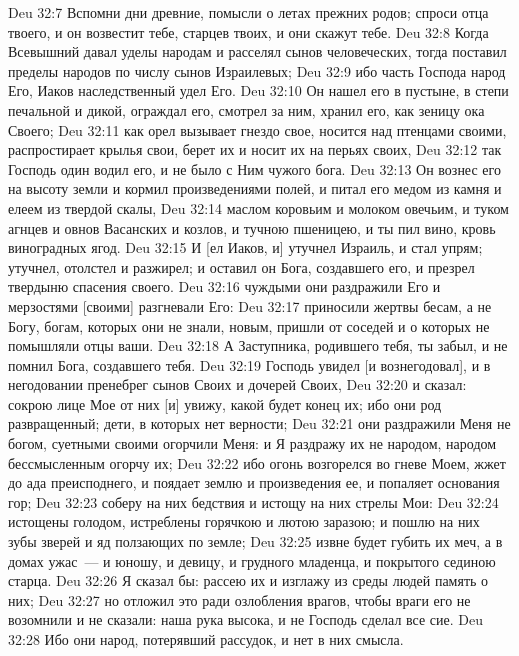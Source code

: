 \vs Deu 32:7 Вспомни дни древние, помысли о летах прежних родов; спроси отца твоего, и он возвестит тебе, старцев твоих, и они скажут тебе.
\vs Deu 32:8 Когда Всевышний давал уделы народам и расселял сынов человеческих, тогда поставил пределы народов по числу сынов Израилевых;
\vs Deu 32:9 ибо часть Господа народ Его, Иаков наследственный удел Его.
\vs Deu 32:10 Он нашел его в пустыне, в степи печальной и дикой, ограждал его, смотрел за ним, хранил его, как зеницу ока Своего;
\vs Deu 32:11 как орел вызывает гнездо свое, носится над птенцами своими, распростирает крылья свои, берет их и носит их на перьях своих,
\vs Deu 32:12 так Господь один водил его, и не было с Ним чужого бога.
\vs Deu 32:13 Он вознес его на высоту земли и кормил произведениями полей, и питал его медом из камня и елеем из твердой скалы,
\vs Deu 32:14 маслом коровьим и молоком овечьим, и туком агнцев и овнов Васанских и козлов, и тучною пшеницею, и ты пил вино, кровь виноградных ягод.
\vs Deu 32:15 И [ел Иаков, и] утучнел Израиль, и стал упрям; утучнел, отолстел и разжирел; и оставил он Бога, создавшего его, и презрел твердыню спасения своего.
\vs Deu 32:16  чуждыми они раздражили Его и мерзостями [своими] разгневали Его:
\vs Deu 32:17 приносили жертвы бесам, а не Богу, богам, которых они не знали, новым,  пришли от соседей и о которых не помышляли отцы ваши.
\vs Deu 32:18 А Заступника, родившего тебя, ты забыл, и не помнил Бога, создавшего тебя.
\vs Deu 32:19 Господь увидел [и вознегодовал], и в негодовании пренебрег сынов Своих и дочерей Своих,
\vs Deu 32:20 и сказал: сокрою лице Мое от них [и] увижу, какой будет конец их; ибо они род развращенный; дети, в которых нет верности;
\vs Deu 32:21 они раздражили Меня не богом, суетными своими огорчили Меня: и Я раздражу их не народом, народом бессмысленным огорчу их;
\vs Deu 32:22 ибо огонь возгорелся во гневе Моем, жжет до ада преисподнего, и поядает землю и произведения ее, и попаляет основания гор;
\vs Deu 32:23 соберу на них бедствия и истощу на них стрелы Мои:
\vs Deu 32:24  истощены голодом, истреблены горячкою и лютою заразою; и пошлю на них зубы зверей и яд ползающих по земле;
\vs Deu 32:25 извне будет губить их меч, а в домах ужас~--- и юношу, и девицу, и грудного младенца, и покрытого сединою старца.
\vs Deu 32:26 Я сказал бы: рассею их и изглажу из среды людей память о них;
\vs Deu 32:27 но отложил это ради озлобления врагов, чтобы враги его не возомнили и не сказали: наша рука высока, и не Господь сделал все сие.
\vs Deu 32:28 Ибо они народ, потерявший рассудок, и нет в них смысла.
